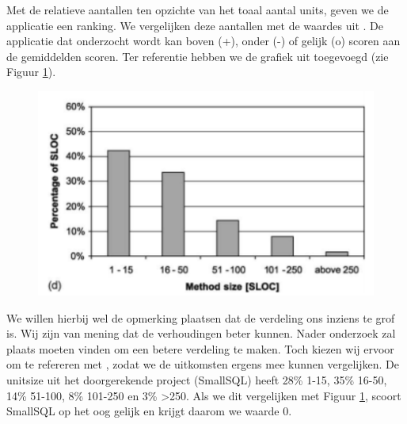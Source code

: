 \documentclass[a4paper]{article}
\begin{document}
Met de relatieve aantallen ten opzichte van het toaal aantal units, geven we de applicatie een ranking. We vergelijken deze aantallen met de waardes uit \cite{B}. De applicatie dat onderzocht wordt kan boven (+), onder (-) of gelijk (o) scoren aan de gemiddelden scoren. Ter referentie hebben we de grafiek uit \cite{B} toegevoegd (zie Figuur \ref{fig:RefVerdeling}).
\begin{figure}[htbp]
\centering
\includegraphics[width=0.8 \textwidth]{Capture.png}
\label{fig:RefVerdeling}
\end{figure}

We willen hierbij wel de opmerking plaatsen dat de verdeling ons inziens te grof is. Wij zijn van mening dat de verhoudingen beter kunnen. Nader onderzoek zal plaats moeten vinden om een betere verdeling te maken. Toch kiezen wij ervoor om te refereren met \cite{B}, zodat we de uitkomsten ergens mee kunnen vergelijken. De unitsize uit het doorgerekende project (SmallSQL) heeft 28\% 1-15, 35\% 16-50, 14\% 51-100, 8\% 101-250 en 3\% \textgreater{}250.
Als we dit vergelijken met Figuur \ref{fig:RefVerdeling}, scoort SmallSQL op het oog gelijk en krijgt daarom we waarde 0.
\end{document}
